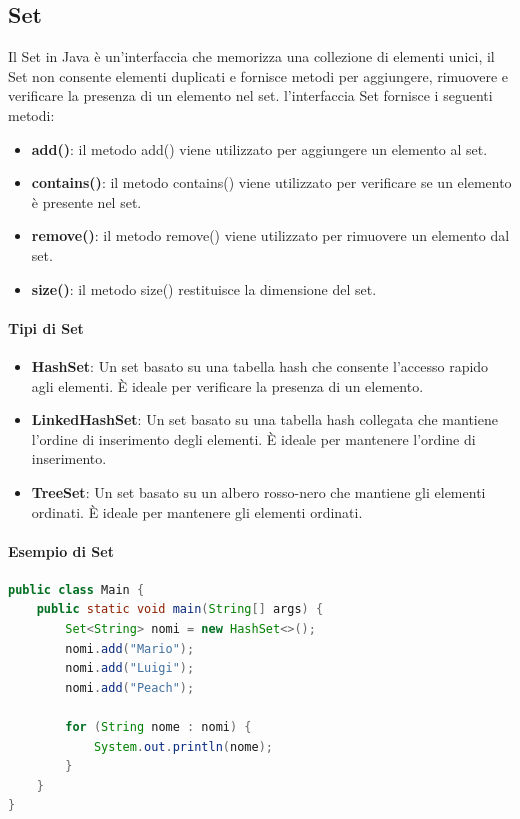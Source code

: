 \documentclass[11pt]{article}
\begin{document}
\subsection{Set}
Il Set in Java è un'interfaccia che memorizza una collezione di elementi unici,
il Set non consente elementi duplicati e fornisce metodi per aggiungere, rimuovere e verificare la presenza di un elemento nel set.
l'interfaccia Set fornisce i seguenti metodi:
\begin{itemize}
    \item \textbf{add()}: il metodo add() viene utilizzato per aggiungere un elemento al set.
    \item \textbf{contains()}: il metodo contains() viene utilizzato per verificare se un elemento è presente nel set.
    \item \textbf{remove()}: il metodo remove() viene utilizzato per rimuovere un elemento dal set.
    \item \textbf{size()}: il metodo size() restituisce la dimensione del set.
    \end{itemize}
\paragraph{Tipi di Set}
\begin{itemize}
    \item \textbf{HashSet}: Un set basato su una tabella hash che consente l'accesso rapido agli elementi. È ideale per verificare la presenza di un elemento.
    \item \textbf{LinkedHashSet}: Un set basato su una tabella hash collegata che mantiene l'ordine di inserimento degli elementi. È ideale per mantenere l'ordine di inserimento.
    \item \textbf{TreeSet}: Un set basato su un albero rosso-nero che mantiene gli elementi ordinati. È ideale per mantenere gli elementi ordinati.
    \end{itemize}
\paragraph{Esempio di Set}
\begin{lstlisting}[language=Java]
public class Main {
    public static void main(String[] args) {
        Set<String> nomi = new HashSet<>();
        nomi.add("Mario");
        nomi.add("Luigi");
        nomi.add("Peach");

        for (String nome : nomi) {
            System.out.println(nome);
        }
    }
}
\end{lstlisting}
\end{document}
